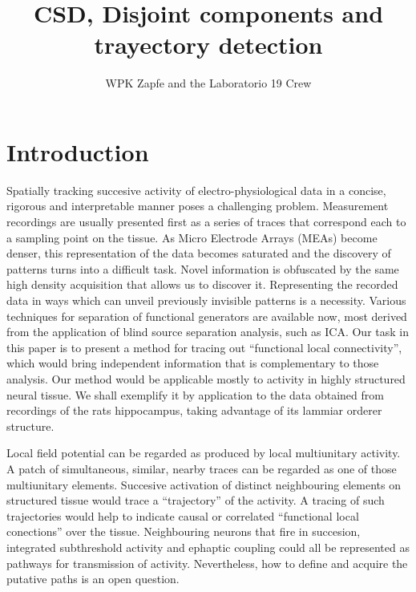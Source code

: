 \documentclass{article}
\author{WPK Zapfe and the Laboratorio 19 Crew}
\title{CSD, Disjoint components and trayectory detection}
\begin{document}
\maketitle

\section{Introduction}

Spatially tracking succesive activity of electro-physiological data in a concise,
rigorous and interpretable manner poses a challenging problem. Measurement recordings
are usually presented first as a series of traces that correspond each to a sampling
point on the tissue. As Micro Electrode Arrays (MEAs) become denser, this representation
of the data becomes saturated and the discovery of patterns turns into a difficult task.
Novel information is obfuscated by the same high density acquisition that allows us to
discover it. Representing  the recorded data in ways which can unveil previously
invisible patterns is a necessity. Various techniques for separation of functional
generators are available now, most derived from the application of blind source
separation analysis, such as ICA. 
Our task in this paper is to present a method for tracing out
``functional local connectivity'', which would bring independent information
that is complementary to those analysis.  Our  method would be applicable mostly to
activity in highly structured neural tissue. We shall exemplify it by application to
the data obtained from recordings of the rats hippocampus, taking advantage of its lammiar orderer structure. 

Local field potential can be regarded as produced by local multiunitary activity.
A patch of simultaneous, similar, nearby traces can be regarded as one of those
multiunitary elements. 
Succesive activation  of distinct neighbouring elements on structured
tissue would trace a
``trajectory'' of the activity. A tracing of such trajectories would help to indicate
causal or correlated ``functional local conections'' over the tissue. Neighbouring
neurons that fire in succesion, integrated subthreshold activity and ephaptic coupling
could all be represented as pathways for transmission of activity. Nevertheless,
how to define and acquire the putative paths is an open question.
\end{document}
